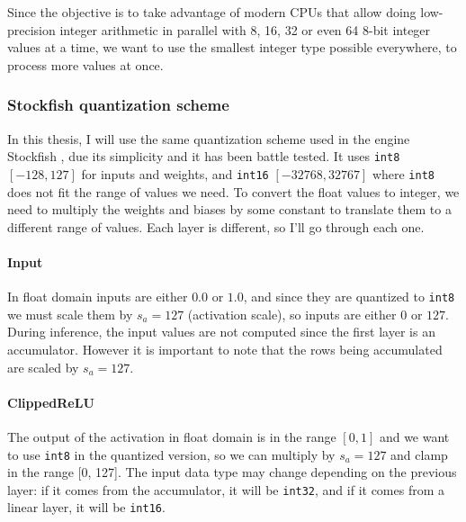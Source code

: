 Since the objective is to take advantage of modern CPUs that allow doing low-precision integer arithmetic in parallel with 8, 16, 32 or even 64 8-bit integer values at a time, we want to use the smallest integer type possible everywhere, to process more values at once.

\newpage
\subsubsection{Stockfish quantization scheme}

\def\int#1{\texttt{int#1}}

In this thesis, I will use the same quantization scheme used in the engine Stockfish \cite{nnue-pytorch}, due its simplicity and it has been battle tested. It uses \int{8} $[-128, 127]$ for inputs and weights, and \int{16} $[-32768, 32767]$ where \int{8} does not fit the range of values we need.
To convert the float values to integer, we need to multiply the weights and biases by some constant to translate them to a different range of values. Each layer is different, so I'll go through each one.


\paragraph[short]{Input} In float domain inputs are either $0.0$ or $1.0$, and since they are quantized to \int{8} we must scale them by $s_a=127$ (activation scale), so inputs are either $0$ or $127$. During inference, the input values are not computed since the first layer is an accumulator. However it is important to note that the rows being accumulated are scaled by $s_a=127$.

\paragraph[short]{ClippedReLU} The output of the activation in float domain is in the range $[0, 1]$ and we want to use \int{8} in the quantized version, so we can multiply by $s_a=127$ and clamp in the range [0, 127]. The input data type may change depending on the previous layer: if it comes from the accumulator, it will be \int{32}, and if it comes from a linear layer, it will be \int{16}.

